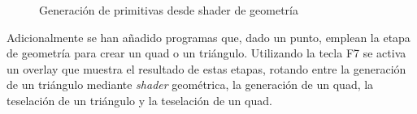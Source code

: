 \documentclass[10pt,oneside,a4paper]{article}
\begin{document}
\begin{figure}[!htb]
\centering
    \qquad
\caption{Generación de primitivas desde shader de geometría}
\end{figure}

Adicionalmente se han añadido programas que, dado un punto, emplean la etapa de geometría para crear un quad o un triángulo. Utilizando la tecla F7 se activa un overlay que muestra el resultado de estas etapas, rotando entre la generación de un triángulo mediante \textit{shader} geométrica, la generación de un quad, la teselación de un triángulo y la teselación de un quad.\\
\end{document}
